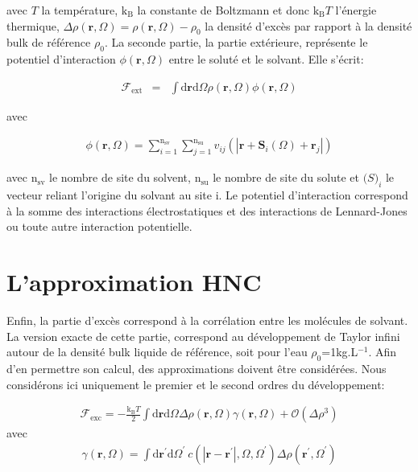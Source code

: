 \noindent avec $T$ la température, $\mathrm{k_B}$ la constante de Boltzmann et donc $\mathrm{k_B}T$ l'énergie thermique, $\Delta\rho\left(\boldsymbol{r},\Omega \right)=\rho\left(\boldsymbol{r},\Omega \right)-\rho_0$ la densité d'excès par rapport à la densité bulk de référence $\rho_0$. La seconde partie, la partie extérieure, représente le potentiel d'interaction $\phi\left(\boldsymbol{r},\Omega \right)$ entre le soluté et le solvant. Elle s'écrit:


\begin{eqnarray}
\mathcal{F}_\mathrm{ext}&=&\int\mathrm{d}\boldsymbol{r}\mathrm{d}\Omega\rho\left(\boldsymbol{r},\Omega \right)\phi\left(\boldsymbol{r},\Omega \right)
\label{eq:fonctionnelle:ext}
\end{eqnarray}

\noindent avec

\begin{eqnarray}
\phi\left(\boldsymbol{r},\Omega \right) = \sum\limits_{i=1}^{\mathrm{n}_\mathrm{sv}}\sum\limits_{j=1}^{\mathrm{n}_\mathrm{su}} v_{ij}(|\boldsymbol{r}+\boldsymbol{S}_i(\Omega)+\boldsymbol{r}_j|)
\end{eqnarray}

\noindent avec $\mathrm{n}_\mathrm{sv}$ le nombre de site du solvent, $\mathrm{n}_\mathrm{su}$ le nombre de site du solute et $\boldsymbol(S)_i$ le vecteur reliant l'origine du solvant au site i. Le potentiel d'interaction correspond à la somme des interactions électrostatiques et des interactions de Lennard-Jones ou toute autre interaction potentielle. 

\section{L'approximation HNC}

Enfin, la partie d'excès correspond à la corrélation entre les molécules de solvant. La version exacte de cette partie, correspond au développement de Taylor infini autour de la densité bulk liquide de référence, soit pour l'eau $\rho_0$=1kg.L$^{-1}$. Afin d'en permettre son calcul, des approximations doivent être considérées. Nous considérons ici uniquement le premier et le second ordres du développement:

\begin{eqnarray}
\mathcal{F}_\mathrm{exc} = -\frac{\mathrm{k_B}T}{2}\int\mathrm{d}\boldsymbol{r}\mathrm{d}\Omega \Delta\rho\left(\boldsymbol{r}, \Omega   \right) \gamma \left(\boldsymbol{r},\Omega\right)  + \mathcal{O}(\Delta\rho^{3})
\label{eq:fonctionnelle:exc}
\end{eqnarray}
\noindent avec
\begin{eqnarray}
\gamma \left(\boldsymbol{r},\Omega\right) = \int\mathrm{d}\boldsymbol{r}^\prime\mathrm{d}\Omega^\prime\  c\left(\left|\boldsymbol{r}-\boldsymbol{r}^\prime\right|,\Omega,\Omega^\prime \right) \Delta\rho\left(\boldsymbol{r}^\prime, \Omega^\prime \right)
\end{eqnarray}

